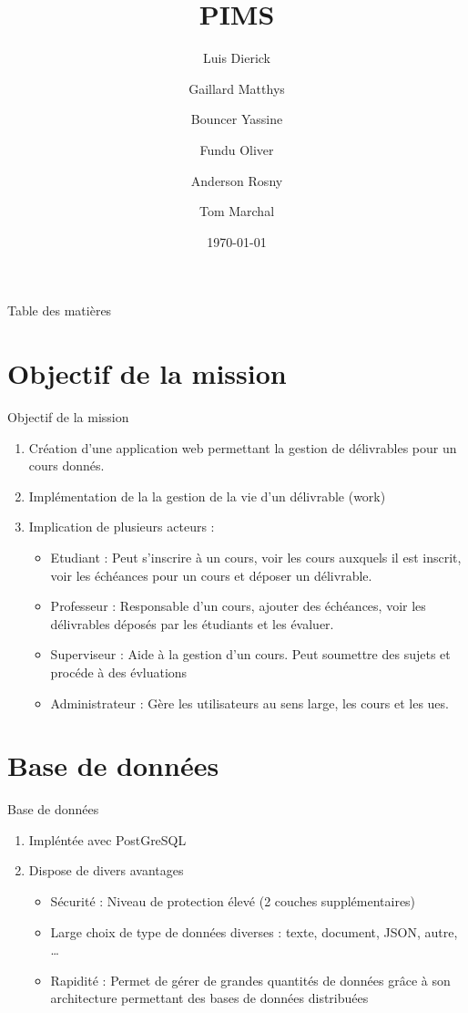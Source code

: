 \documentclass[numbering=fraction,10pt]{beamer}
\title{PIMS}
\author[PIMS]{Luis Dierick \and Gaillard Matthys \and Bouncer Yassine \and Fundu Oliver \and Anderson Rosny \and Tom Marchal }
\institute{Université de Namur}
\date{\today}
\begin{document}
\begin{frame}[plain]{}
    \maketitle
\end{frame}

\begin{frame}{Table des matières}
    \tableofcontents
\end{frame}
\section{Objectif de la mission}
\begin{frame}{Objectif de la mission}
    \begin{enumerate}
        \item Création d'une application web permettant la gestion de délivrables pour un cours donnés.
        \item Implémentation de la la gestion de la vie d'un délivrable (work)
        \item Implication de plusieurs acteurs : 
        \begin{itemize}
            \item Etudiant : Peut s'inscrire à un cours, voir les cours auxquels il est inscrit, voir les échéances pour un cours et déposer un délivrable.
            \item Professeur : Responsable d'un cours, ajouter des échéances, voir les délivrables déposés par les étudiants et les évaluer.
            \item Superviseur : Aide à la gestion d'un cours. Peut soumettre des sujets et procéde à des évluations
            \item Administrateur : Gère les utilisateurs au sens large, les cours et les ues.
        \end{itemize}
    \end{enumerate}
\end{frame}
\section{Base de données}
\begin{frame}{Base de données}
    \begin{enumerate}
        \item Impléntée avec PostGreSQL
        \item Dispose de divers avantages
        \begin{itemize}
            \item Sécurité : Niveau de protection élevé (2 couches supplémentaires)
            \item Large choix de type de données diverses : texte, document, JSON, autre, \dots
            \item Rapidité : Permet de gérer de grandes quantités de données grâce à son architecture permettant des bases de données distribuées
        \end{itemize}
    \end{enumerate}
\end{frame}
\end{document}

